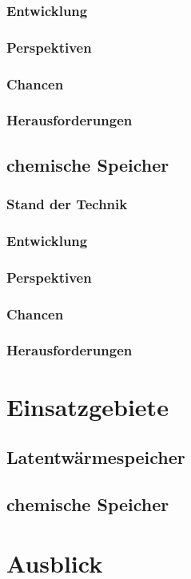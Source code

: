 \documentclass[11pt,a4paper]{scrartcl}
\begin{document}
\subsubsection{Entwicklung}
\subsubsection{Perspektiven}
\subsubsection{Chancen}
\subsubsection{Herausforderungen}
\subsection{chemische Speicher}
\subsubsection{Stand der Technik}
\subsubsection{Entwicklung}
\subsubsection{Perspektiven}
\subsubsection{Chancen}
\subsubsection{Herausforderungen}


\newpage
\section{Einsatzgebiete}
\subsection{Latentwärmespeicher}
\subsection{chemische Speicher}

\newpage
\section{Ausblick}
\end{document}

